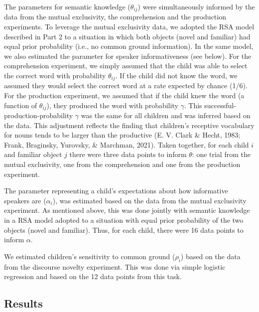 \documentclass[
  man,floatsintext]{apa6}
\begin{document}
The parameters for semantic knowledge (\(\theta_{ij}\)) were simultaneously informed by the data from the mutual exclusivity, the comprehension and the production experiments. To leverage the mutual exclusivity data, we adopted the RSA model described in Part 2 to a situation in which both objects (novel and familiar) had equal prior probability (i.e., no common ground information). In the same model, we also estimated the parameter for speaker informativeness (see below). For the comprehension experiment, we simply assumed that the child was able to select the correct word with probability \(\theta_{ij}\). If the child did not know the word, we assumed they would select the correct word at a rate expected by chance (1/6). For the production experiment, we assumed that if the child knew the word (a function of \(\theta_{ij}\)), they produced the word with probability \(\gamma\). This successful-production-probability \(\gamma\) was the same for all children and was inferred based on the data. This adjustment reflects the finding that children's receptive vocabulary for nouns tends to be larger than the productive (E. V. Clark \& Hecht, 1983; Frank, Braginsky, Yurovsky, \& Marchman, 2021). Taken together, for each child \(i\) and familiar object \(j\) there were three data points to inform \(\theta\): one trial from the mutual exclusivity, one from the comprehension and one from the production experiment.

The parameter representing a child's expectations about how informative speakers are (\(\alpha_i\)), was estimated based on the data from the mutual exclusivity experiment. As mentioned above, this was done jointly with semantic knowledge in a RSA model adopted to a situation with equal prior probability of the two objects (novel and familiar). Thus, for each child, there were 16 data points to inform \(\alpha\).

We estimated children's sensitivity to common ground (\(\rho_i\)) based on the data from the discourse novelty experiment. This was done via simple logistic regression and based on the 12 data points from this task.

\hypertarget{results}{%
\subsection{Results}\label{results}}
\end{document}
